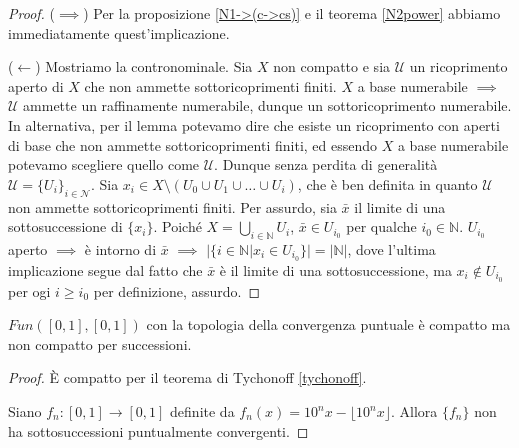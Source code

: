 \begin{proof}
  ($\implies$) Per la proposizione \ref{N1->(c->cs)} e il teorema \ref{N2power} abbiamo immediatamente quest'implicazione.

  ($\leftarrow$) Mostriamo la contronominale. Sia $X$ non compatto e sia $\mathcal{U}$ un ricoprimento aperto di $X$ che non ammette sottoricoprimenti finiti. $X$ a base numerabile $\implies$ $\mathcal{U}$ ammette un raffinamente numerabile, dunque un sottoricoprimento numerabile. In alternativa, per il lemma \label{comp_base} potevamo dire che esiste un ricoprimento con aperti di base che non ammette sottoricoprimenti finiti, ed essendo $X$ a base numerabile potevamo scegliere quello come $\mathcal{U}$.
  Dunque senza perdita di generalità $\mathcal{U}=\{U_i\}_{i \in \mathcal{N}}$. Sia $x_i \in  X \setminus (U_0 \cup U_1 \cup \dots \cup U_i)$, che è ben definita in quanto $\mathcal{U}$ non ammette sottoricoprimenti finiti. Per assurdo, sia $\bar{x}$ il limite di una sottosuccessione di $\{x_i\}$.
  Poiché $\displaystyle X=\bigcup_{i \in \mathbb{N}} U_i$, $\bar{x} \in U_{i_0}$ per qualche $i_0 \in \mathbb{N}$. $U_{i_0}$ aperto $\implies$ è intorno di
  $\bar{x}$ $\implies$ $|\{i \in \mathbb{N} | x_i \in U_{i_0} \}|=|\mathbb{N}|$, dove l'ultima implicazione segue dal fatto che $\bar{x}$ è il limite di una sottosuccessione, ma $x_i \not\in U_{i_0}$ per ogi $i \ge i_0$ per definizione, assurdo.
\end{proof}

\begin{ex}
  \begin{ftt}
    $Fun([0, 1], [0, 1])$ con la topologia della convergenza puntuale è compatto ma non compatto per successioni.
  \end{ftt}
  \begin{proof}
    È compatto per il teorema di Tychonoff \ref{tychonoff}.

    Siano $f_n:[0, 1] \rightarrow [0, 1]$ definite da $f_n(x)=10^nx-\lfloor 10^nx \rfloor$. Allora $\{f_n\}$ non ha sottosuccessioni puntualmente convergenti.
  \end{proof}
\end{ex}
